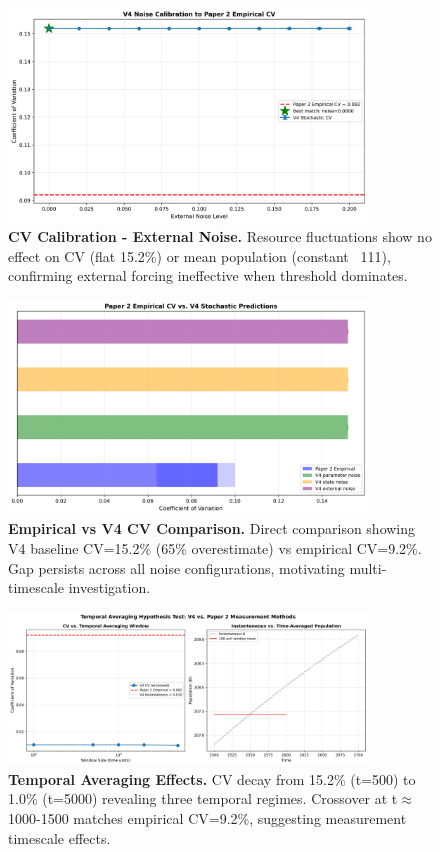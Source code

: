 \documentclass[
]{article}
\begin{document}
\begin{figure}[htbp]
\centering
\includegraphics[width=0.85\textwidth]{figures/paper7_fig13_cv_calibration_external.png}
\caption{\textbf{CV Calibration - External Noise.} Resource fluctuations show no effect on CV (flat 15.2\%) or mean population (constant ~111), confirming external forcing ineffective when threshold dominates.}
\label{fig:cv-external}
\end{figure}

\begin{figure}[htbp]
\centering
\includegraphics[width=0.85\textwidth]{figures/paper7_fig14_empirical_vs_v4.png}
\caption{\textbf{Empirical vs V4 CV Comparison.} Direct comparison showing V4 baseline CV=15.2\% (65\% overestimate) vs empirical CV=9.2\%. Gap persists across all noise configurations, motivating multi-timescale investigation.}
\label{fig:empirical-comparison}
\end{figure}

\begin{figure}[htbp]
\centering
\includegraphics[width=0.85\textwidth]{figures/paper7_fig15_temporal_averaging.png}
\caption{\textbf{Temporal Averaging Effects.} CV decay from 15.2\% (t=500) to 1.0\% (t=5000) revealing three temporal regimes. Crossover at t$\approx$1000-1500 matches empirical CV=9.2\%, suggesting measurement timescale effects.}
\label{fig:temporal-averaging}
\end{figure}
\end{document}
